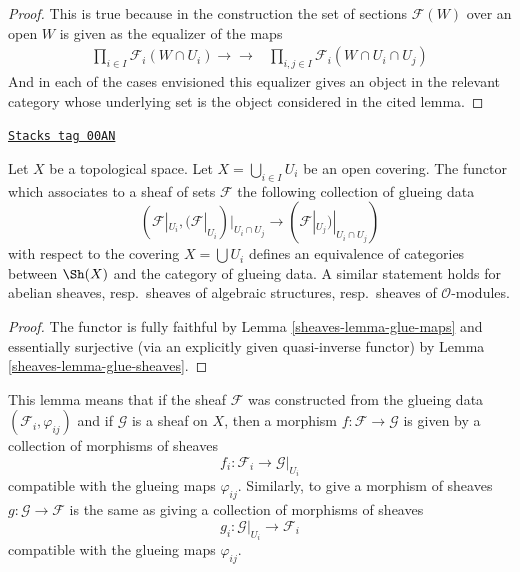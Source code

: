 \begin{proof}
This is true because in the construction the set of sections
$\mathcal{F}(W)$ over an open $W$ is given as the
equalizer of the maps
$$
\begin{array}{cc}\prod_{i \in I} \mathcal{F}_i(W \cap U_i)
\longrightarrow\longrightarrow & \prod_{i, j\in I} \mathcal{F}_i(W \cap U_i \cap U_j)\end{array}
$$
And in each of the cases envisioned this equalizer gives
an object in the relevant category whose underlying set is
the object considered in the cited lemma.
\end{proof}

\begin{lemma}
\label{sheaves-lemma-mapping-property-glue}
\href{https://stacks.math.columbia.edu/tag/00AN}{\texttt{Stacks tag 00AN}}

Let $X$ be a topological space.
Let $X = \bigcup_{i\in I} U_i$ be an open covering.
The functor which associates to a sheaf of
sets $\mathcal{F}$ the following collection of
glueing data
$$
(\mathcal{F}|_{U_i},
(\mathcal{F}|_{U_i})|_{U_i \cap U_j}
\to
(\mathcal{F}|_{U_j})|_{U_i \cap U_j}
)
$$
with respect to the covering $X = \bigcup U_i$
defines an equivalence of categories between
$\Sh(X)$ and the category of glueing
data. A similar statement holds for
abelian sheaves, resp.\ sheaves of algebraic structures,
resp.\ sheaves of $\mathcal{O}$-modules.
\end{lemma}

\begin{proof}

The functor is fully faithful by
Lemma \ref{sheaves-lemma-glue-maps}
and essentially surjective (via an explicitly given quasi-inverse functor) by
Lemma \ref{sheaves-lemma-glue-sheaves}.
\end{proof}

This lemma means that if the sheaf $\mathcal{F}$ was constructed
from the glueing data $(\mathcal{F}_i, \varphi_{ij})$
and if $\mathcal{G}$ is a sheaf on $X$, then a morphism
$f : \mathcal{F} \to \mathcal{G}$ is given by a collection of
morphisms of sheaves
$$
f_i : \mathcal{F}_i \longrightarrow \mathcal{G}|_{U_i}
$$
compatible with the glueing maps $\varphi_{ij}$. Similarly,
to give a morphism of sheaves $g : \mathcal{G} \to \mathcal{F}$
is the same as giving a collection of morphisms of sheaves
$$
g_i : \mathcal{G}|_{U_i} \longrightarrow \mathcal{F}_i
$$
compatible with the glueing maps $\varphi_{ij}$.



